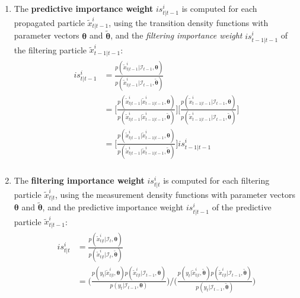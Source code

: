 \documentclass[11pt, oneside]{scrreprt}   	%
\begin{document}
\begin{enumerate}
	\item The \textbf{predictive importance weight} $is_{t|t-1}^i$ is computed for each propagated particle $\tilde{x}_{t|t-1}^i$, using the transition density functions with parameter vectors $\boldsymbol{\theta}$ and $\boldsymbol{\tilde{\theta}}$, and the \textit{filtering importance weight} $is_{t-1|t-1}^i$ of the filtering particle $\tilde{x}_{t-1|t-1}^i$:
	\begin{align*} 
	\begin{split}
	is_{t|t-1}^i &= \frac{p(\tilde{x}_{t|t-1}^i | \mathcal{I}_{t-1}, \boldsymbol{\theta})}{p(\tilde{x}_{t|t-1}^i | \mathcal{I}_{t-1}, \boldsymbol{\tilde{\theta}})}\\
	&= \bigg[ \frac{p(\tilde{x}_{t|t-1}^i | \tilde{x}_{t-1|t-1}^i, \boldsymbol{\theta})}{p(\tilde{x}_{t|t-1}^i | \tilde{x}_{t-1|t-1}^i, \boldsymbol{\tilde{\theta}})} \bigg] \bigg[ \frac{p(\tilde{x}_{t-1|t-1}^i | \mathcal{I}_{t-1}, \boldsymbol{\theta})}{p(\tilde{x}_{t-1|t-1}^i | \mathcal{I}_{t-1}, \boldsymbol{\tilde{\theta}})}\bigg]\\
	&= \bigg[ \frac{p(\tilde{x}_{t|t-1}^i | \tilde{x}_{t-1|t-1}^i, \boldsymbol{\theta})}{p(\tilde{x}_{t|t-1}^i | \tilde{x}_{t-1|t-1}^i, \boldsymbol{\tilde{\theta}})} \bigg] is_{t-1|t-1}^i\\	
	\end{split}					
	\end{align*}  
	\item The \textbf{filtering importance weight} $is_{t|t}^i$ is computed for each filtering particle $\tilde{x}_{t|t}^i$, using the measurement density functions with parameter vectors $\boldsymbol{\theta}$ and $\boldsymbol{\tilde{\theta}}$, and the predictive importance weight $is_{t|t-1}^i$ of the predictive particle $\tilde{x}_{t|t-1}^i$:
	\begin{align*} 
	\begin{split}
	is_{t|t}^i &= \frac{p(\tilde{x}_{t|t}^i | \mathcal{I}_{t}, \boldsymbol{\theta})}{p(\tilde{x}_{t|t}^i | \mathcal{I}_{t}, \boldsymbol{\tilde{\theta}})}\\
	&= \bigg( \frac{p(y_t | \tilde{x}_{t|t}^i, \boldsymbol{\theta}) p(\tilde{x}_{t|t}^i | \mathcal{I}_{t-1}, \boldsymbol{\theta})}{p(y_t | \mathcal{I}_{t-1}, \boldsymbol{\theta})} \bigg) / \bigg( \frac{p(y_t | \tilde{x}_{t|t}^i, \boldsymbol{\tilde{\theta}}) p(\tilde{x}_{t|t}^i | \mathcal{I}_{t-1}, \boldsymbol{\tilde{\theta}})}{p(y_t | \mathcal{I}_{t-1}, \boldsymbol{\tilde{\theta}})} \bigg)\\

\end{split}
\end{align*}
\end{enumerate}
\end{document}
